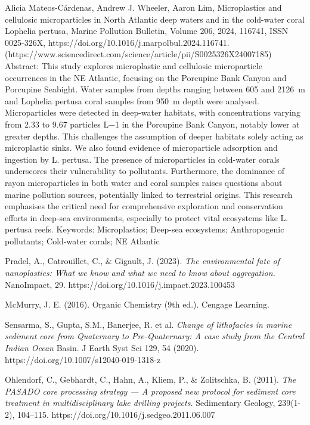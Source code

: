 \documentclass[twocolumn,a4paper,aps,amsmath,amssymb,floatfix,superscriptaddress]{revtex4-2}
\begin{document}
\begin{thebibliography}{10}
		Alicia Mateos-Cárdenas, Andrew J. Wheeler, Aaron Lim,
		Microplastics and cellulosic microparticles in North Atlantic deep waters and in the cold-water coral Lophelia pertusa,
		Marine Pollution Bulletin,
		Volume 206,
		2024,
		116741,
		ISSN 0025-326X,
		https://doi.org/10.1016/j.marpolbul.2024.116741.
		(https://www.sciencedirect.com/science/article/pii/S0025326X24007185)
		Abstract: This study explores microplastic and cellulosic microparticle occurrences in the NE Atlantic, focusing on the Porcupine Bank Canyon and Porcupine Seabight. Water samples from depths ranging between 605 and 2126 m and Lophelia pertusa coral samples from 950 m depth were analysed. Microparticles were detected in deep-water habitats, with concentrations varying from 2.33 to 9.67 particles L−1 in the Porcupine Bank Canyon, notably lower at greater depths. This challenges the assumption of deeper habitats solely acting as microplastic sinks. We also found evidence of microparticle adsorption and ingestion by L. pertusa. The presence of microparticles in cold-water corals underscores their vulnerability to pollutants. Furthermore, the dominance of rayon microparticles in both water and coral samples raises questions about marine pollution sources, potentially linked to terrestrial origins. This research emphasises the critical need for comprehensive exploration and conservation efforts in deep-sea environments, especially to protect vital ecosystems like L. pertusa reefs.
		Keywords: Microplastics; Deep-sea ecosystems; Anthropogenic pollutants; Cold-water corals; NE Atlantic
		
		Pradel, A., Catrouillet, C., \& Gigault, J. (2023). \textit{The environmental fate of nanoplastics: What we know and what we need to know about aggregation.} NanoImpact, 29. https://doi.org/10.1016/j.impact.2023.100453
		
		McMurry, J. E. (2016). Organic Chemistry (9th ed.). Cengage Learning.
		
		Sensarma, S., Gupta, S.M., Banerjee, R. et al. \textit{Change of lithofacies in marine sediment core from Quaternary to Pre-Quaternary: A case study from the Central Indian Ocean} Basin. J Earth Syst Sci 129, 54 (2020). https://doi.org/10.1007/s12040-019-1318-z 
		
		Ohlendorf, C., Gebhardt, C., Hahn, A., Kliem, P., \& Zolitschka, B. (2011). \textit{The PASADO core processing strategy — A proposed new protocol for sediment core treatment in multidisciplinary lake drilling projects.} Sedimentary Geology, 239(1-2), 104–115. https://doi.org/10.1016/j.sedgeo.2011.06.007
		

\end{thebibliography}
\end{document}
